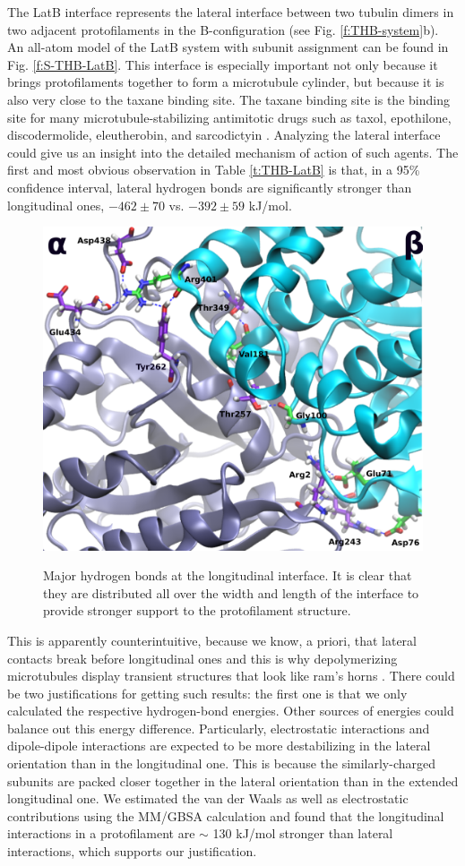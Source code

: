 \documentclass[11pt]{report}
\begin{document}
The LatB interface represents the lateral interface between two tubulin dimers in two adjacent protofilaments in the B-configuration (see Fig.
\ref{f:THB-system}b). An all-atom model of the
LatB system with subunit assignment can be found in Fig.
\ref{f:S-THB-LatB}. This interface is especially important not only because it brings protofilaments together to form a microtubule cylinder, but because it is also very close to the taxane binding site. The taxane binding site is the binding site for many microtubule-stabilizing antimitotic drugs such as taxol, epothilone, discodermolide, eleutherobin, and sarcodictyin
\cite{Bollag1995,Hamel1999,Kowalski1997,Buey2005,Ayoub2014}. Analyzing the lateral interface could give us an insight into the detailed mechanism of action of such agents. The first and most obvious observation in Table
\ref{t:THB-LatB} 
is that, in a 95\% confidence interval, lateral hydrogen bonds are significantly stronger than longitudinal ones, $-462\pm70$ vs. $-392\pm59$ kJ/mol.

\begin{figure}
  \centering
  \caption[Major hydrogen bonds at the longitudinal interface]{Major hydrogen bonds at the longitudinal interface.
  It is clear that they are distributed all over the width and length
  of the interface to provide stronger support to the protofilament
  structure.}
  \includegraphics[width=0.7\linewidth]{images/HB-LongAB}
  \label{f:THB-longHB}
\end{figure}

This is apparently counterintuitive, because we know, a
priori, that lateral contacts break before longitudinal ones and this is why depolymerizing microtubules display transient structures that look like ram's horns
\cite{Sept2003,VanBuren2002}. 
There could be two justifications for getting such results: the first one is that we only calculated the respective hydrogen-bond energies. Other sources of energies could balance out this energy difference. Particularly, electrostatic interactions and dipole-dipole interactions are expected to be more destabilizing in the lateral orientation than in the longitudinal one. This is because the similarly-charged subunits are packed closer together in the lateral orientation than in the extended longitudinal one. 
We estimated the van der Waals as well as electrostatic contributions using the MM/GBSA calculation and found that the longitudinal interactions in a protofilament are $\sim$ 130 kJ/mol stronger than lateral interactions, which supports our justification.
\end{document}
